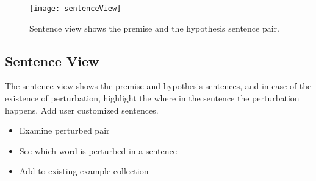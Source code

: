
\begin{figure}[htbp]
\centering
\vspace{-2mm}
 \texttt{[image: sentenceView]}
 \caption{Sentence view shows the premise and the hypothesis sentence pair.}
\label{fig:modelPipeline}
\end{figure}

\subsection{Sentence View}
The sentence view shows the premise and hypothesis sentences, and in case of the existence of perturbation, highlight the where in the sentence the perturbation happens.
%
Add user customized sentences.

\begin{itemize}
\item Examine perturbed pair
\item See which word is perturbed in a sentence
\item Add to existing example collection
\end{itemize}

